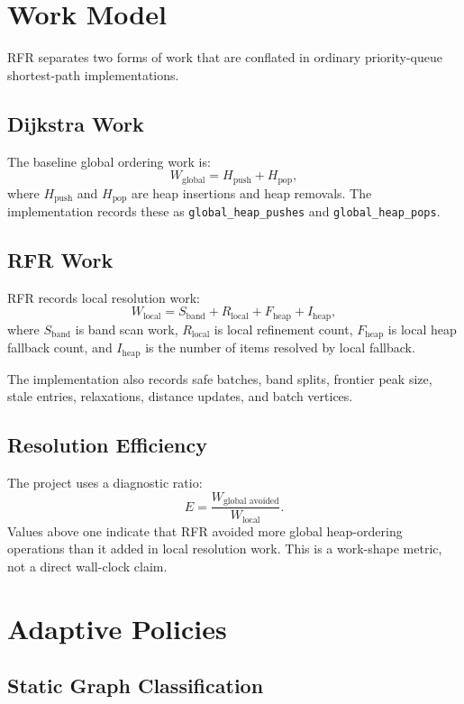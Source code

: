 \documentclass[11pt]{article}
\newcommand{\RFR}{\textsc{RFR}}
\begin{document}
\section{Work Model}
\label{sec:work}

\RFR{} separates two forms of work that are conflated in ordinary priority-queue shortest-path implementations.

\subsection{Dijkstra Work}

The baseline global ordering work is:
\[
  W_{\text{global}} = H_{\text{push}} + H_{\text{pop}},
\]
where $H_{\text{push}}$ and $H_{\text{pop}}$ are heap insertions and heap removals. The implementation records these as \texttt{global\_heap\_pushes} and \texttt{global\_heap\_pops}.

\subsection{RFR Work}

\RFR{} records local resolution work:
\[
  W_{\text{local}} =
  S_{\text{band}} +
  R_{\text{local}} +
  F_{\text{heap}} +
  I_{\text{heap}},
\]
where $S_{\text{band}}$ is band scan work, $R_{\text{local}}$ is local refinement count, $F_{\text{heap}}$ is local heap fallback count, and $I_{\text{heap}}$ is the number of items resolved by local fallback.

The implementation also records safe batches, band splits, frontier peak size, stale entries, relaxations, distance updates, and batch vertices.

\subsection{Resolution Efficiency}

The project uses a diagnostic ratio:
\[
  E = \frac{W_{\text{global avoided}}}{W_{\text{local}}}.
\]
Values above one indicate that \RFR{} avoided more global heap-ordering operations than it added in local resolution work. This is a work-shape metric, not a direct wall-clock claim.

\section{Adaptive Policies}
\label{sec:adaptive}

\subsection{Static Graph Classification}
\end{document}
